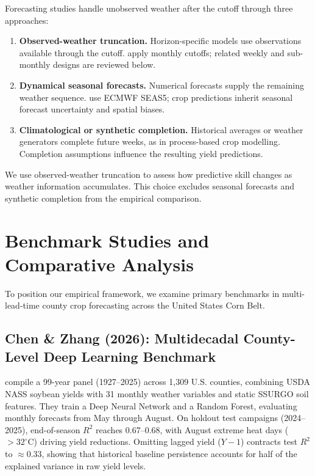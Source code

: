 Forecasting studies handle unobserved weather after the cutoff through three approaches:
\begin{enumerate}
    \item \textbf{Observed-weather truncation.} Horizon-specific models use observations available through the cutoff. \citet{ChenZhang2026} apply monthly cutoffs; related weekly and sub-monthly designs are reviewed below.
    \item \textbf{Dynamical seasonal forecasts.} Numerical forecasts supply the remaining weather sequence. \citet{Ceglar2021} use ECMWF SEAS5; crop predictions inherit seasonal forecast uncertainty and spatial biases.
    \item \textbf{Climatological or synthetic completion.} Historical averages or weather generators complete future weeks, as in process-based crop modelling. Completion assumptions influence the resulting yield predictions.
\end{enumerate}
We use observed-weather truncation to assess how predictive skill changes as weather information accumulates. This choice excludes seasonal forecasts and synthetic completion from the empirical comparison.

\section{Benchmark Studies and Comparative Analysis}
\label{sec:lit_closest_studies}

To position our empirical framework, we examine primary benchmarks in multi-lead-time county crop forecasting across the United States Corn Belt.

\subsection{Chen \& Zhang (2026): Multidecadal County-Level Deep Learning Benchmark}
\citet{ChenZhang2026} compile a 99-year panel (1927--2025) across 1,309 U.S. counties, combining USDA NASS soybean yields with 31 monthly weather variables and static SSURGO soil features. They train a Deep Neural Network and a Random Forest, evaluating monthly forecasts from May through August. On holdout test campaigns (2024--2025), end-of-season $R^2$ reaches 0.67--0.68, with August extreme heat days ($>32^\circ\text{C}$) driving yield reductions. Omitting lagged yield ($Y-1$) contracts test $R^2$ to $\approx 0.33$, showing that historical baseline persistence accounts for half of the explained variance in raw yield levels.

